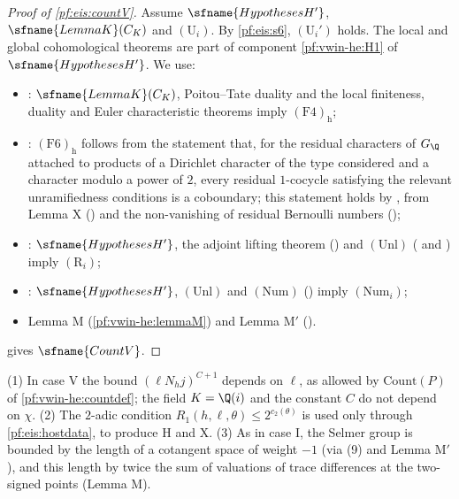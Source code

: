 \begin{proof}[Proof of \cref{pf:eis:countV}]
Assume $\sfname{HypothesesH'}$, $\sfname{LemmaK}(C_K)$ and $(\mathrm{U}_i)$. By \cref{pf:eis:s6}, $(\mathrm{U}_i')$ holds. The local and global
cohomological theorems are part of component \ref{pf:vwin-he:H1} of $\sfname{HypothesesH'}$. We use:
\begin{itemize}
\item {}: $\sfname{LemmaK}(C_K)$, Poitou--Tate duality and the local finiteness, duality and Euler
  characteristic theorems imply $(\mathrm{F4})_{\mathrm h}$;
\item {}: $(\mathrm{F6})_{\mathrm h}$ follows from the statement that, for the residual characters of
  $G_\Q$ attached to products of a Dirichlet character of the type considered and a character modulo a power of $2$, every residual
  $1$-cocycle satisfying the relevant unramifiedness conditions is a coboundary; this statement holds by
  , from Lemma X () and the non-vanishing of residual Bernoulli
  numbers ();
\item {}: $\sfname{HypothesesH'}$, the adjoint lifting theorem
  () and $(\mathrm{Unl})$
  ( and ) imply $(\mathrm{R}_i)$;
\item {}: $\sfname{HypothesesH'}$, $(\mathrm{Unl})$ and $(\mathrm{Num})$
  () imply $(\mathrm{Num}_i)$;
\item Lemma M (\cref{pf:vwin-he:lemmaM}) and Lemma M$'$ ().
\end{itemize}
 gives $\sfname{CountV}$.
\end{proof}

\begin{remark}\label{pf:eis:countVrem}
(1) In case V the bound $(\ell N_hj)^{C+1}$ depends on $\ell$, as allowed by $\mathrm{Count}(P)$ of \cref{pf:vwin-he:countdef}; the field $K=\Q(i)$ and the constant $C$ do not
depend on $\chi$. (2) The $2$-adic condition $R_1(h,\ell,\theta)\le2^{c_2(\theta)}$ is used only through \cref{pf:eis:hostdata}, to produce
$\mathrm{H}$ and $\mathrm{X}$. (3) As in case I, the Selmer group is bounded by the length of a cotangent space of weight $-1$ (via
(9) and Lemma M$'$), and this length by twice the sum of valuations of trace differences at the two-signed points (Lemma M).
\end{remark}

